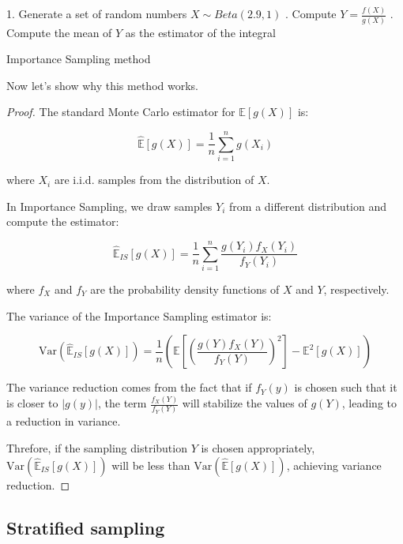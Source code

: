 \documentclass{report}
\begin{document}
\begin{center}
	\begin{minipage}{0.7\linewidth} %
		\begin{algorithm}[H]
			1. Generate a set of random numbers \(X \sim Beta(2.9,1)\) . Compute \(Y = \frac{f(X)}{g(X)}\) . Compute the mean of \(Y\) as the estimator of the integral \;
			\caption{Importance Sampling method} %
			\label{alg:importancesampling}   %
		\end{algorithm}
	\end{minipage}
\end{center}

Now let's show why this method works.

\begin{proof}
	The standard Monte Carlo estimator for \( \mathbb{E}[g(X)] \) is:
	
	\[ \hat{\mathbb{E}}[g(X)] = \frac{1}{n} \sum_{i=1}^{n} g(X_i) \]
	
	where \( X_i \) are i.i.d. samples from the distribution of \( X \).
	
	In Importance Sampling, we draw samples \( Y_i \) from a different distribution and compute the estimator:

	\[ \hat{\mathbb{E}}_{IS}[g(X)] = \frac{1}{n} \sum_{i=1}^{n} \frac{g(Y_i) f_X(Y_i)}{f_Y(Y_i)} \]
	   
	where \( f_X \) and \( f_Y \) are the probability density functions of \( X \) and \( Y \), respectively.
	
	The variance of the Importance Sampling estimator is:
	   
	\[ \mathrm{Var}(\hat{\mathbb{E}}_{IS}[g(X)]) = \frac{1}{n} \left( \mathbb{E}\left[ \left( \frac{g(Y) f_X(Y)}{f_Y(Y)} \right)^2 \right] - \mathbb{E}^2[g(X)] \right) \]
	   
	The variance reduction comes from the fact that if \( f_Y(y) \) is chosen such that it is closer to \( |g(y)| \), the term \( \frac{f_X(Y)}{f_Y(Y)} \) will stabilize the values of \( g(Y) \), leading to a reduction in variance. 
	   
	Threfore, if the sampling distribution \( Y \) is chosen appropriately, \( \mathrm{Var}(\hat{\mathbb{E}}_{IS}[g(X)]) \) will be less than \( \mathrm{Var}(\hat{\mathbb{E}}[g(X)]) \), achieving variance reduction.
\end{proof}


\subsection{Stratified sampling}
\label{sec:stratified_sampling}
\end{document}
